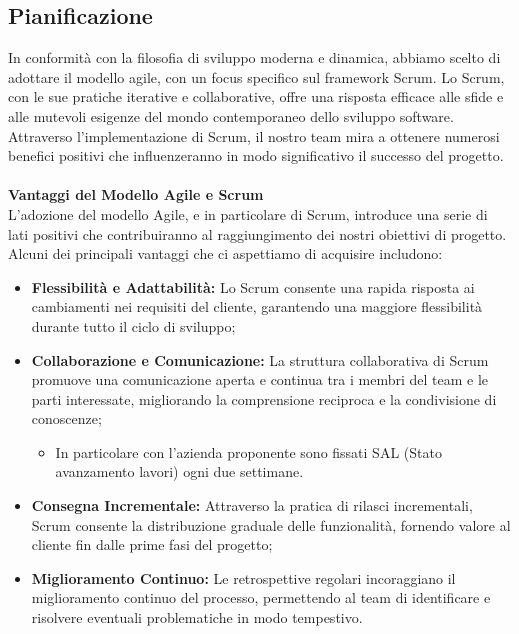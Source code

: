 \documentclass{article}
\begin{document}
\subsection{Pianificazione}
In conformità con la filosofia di sviluppo moderna e dinamica, abbiamo scelto di adottare il modello agile, con un focus specifico sul framework Scrum.
Lo Scrum, con le sue pratiche iterative e collaborative, offre una risposta efficace alle sfide e alle mutevoli esigenze del mondo contemporaneo dello sviluppo software.\\
Attraverso l'implementazione di Scrum, il nostro team mira a ottenere numerosi benefici positivi che influenzeranno in modo significativo il successo del progetto.
\\
\\
\textbf{Vantaggi del Modello Agile e Scrum}
\\L'adozione del modello Agile, e in particolare di Scrum, introduce una serie di lati positivi che contribuiranno al raggiungimento dei nostri obiettivi di progetto.
Alcuni dei principali vantaggi che ci aspettiamo di acquisire includono:

\begin{itemize}
    \item \textbf{Flessibilità e Adattabilità:} Lo Scrum consente una rapida risposta ai cambiamenti nei requisiti del cliente, garantendo una maggiore flessibilità durante tutto il ciclo di sviluppo;
    \item \textbf{Collaborazione e Comunicazione:} La struttura collaborativa di Scrum promuove una comunicazione aperta e continua tra i membri del team e le parti interessate, migliorando la comprensione reciproca e la condivisione di conoscenze;
          \begin{itemize}
              \item In particolare con l'azienda proponente sono fissati SAL (Stato avanzamento lavori) ogni due settimane.
          \end{itemize}
    \item \textbf{Consegna Incrementale:} Attraverso la pratica di rilasci incrementali, Scrum consente la distribuzione graduale delle funzionalità, fornendo valore al cliente fin dalle prime fasi del progetto;
    \item \textbf{Miglioramento Continuo:} Le retrospettive regolari incoraggiano il miglioramento continuo del processo, permettendo al team di identificare e risolvere eventuali problematiche in modo tempestivo.
\end{itemize}
\end{document}
